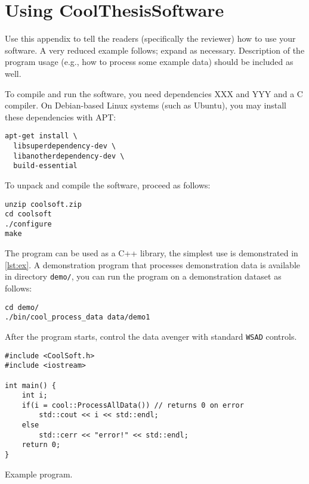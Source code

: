 \chapter{Using CoolThesisSoftware}


Use this appendix to tell the readers (specifically the reviewer) how to use your software. A very reduced example follows; expand as necessary. Description of the program usage (e.g., how to process some example data) should be included as well.

To compile and run the software, you need dependencies XXX and YYY and a C compiler. On Debian-based Linux systems (such as Ubuntu), you may install these dependencies with APT:
\begin{Verbatim}
apt-get install \
  libsuperdependency-dev \
  libanotherdependency-dev \
  build-essential
\end{Verbatim}

To unpack and compile the software, proceed as follows:
\begin{Verbatim}
unzip coolsoft.zip
cd coolsoft
./configure
make
\end{Verbatim}

The program can be used as a C++ library, the simplest use is demonstrated in \cref{lst:ex}. A demonstration program that processes demonstration data is available in directory \verb|demo/|, you can run the program on a demonstration dataset as follows:
\begin{Verbatim}
cd demo/
./bin/cool_process_data data/demo1
\end{Verbatim}

After the program starts, control the data avenger with standard \verb-WSAD- controls.

\begin{listing}
\begin{lstlisting}
#include <CoolSoft.h>
#include <iostream>

int main() {
	int i;
	if(i = cool::ProcessAllData()) // returns 0 on error
		std::cout << i << std::endl;
	else
		std::cerr << "error!" << std::endl;
	return 0;
}
\end{lstlisting}
\caption{Example program.}
\label{lst:ex}
\end{listing}

